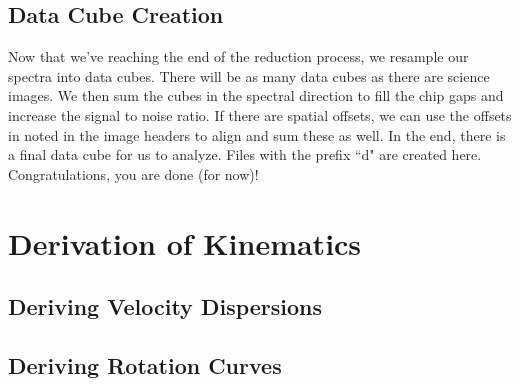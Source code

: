 \documentclass[12pt]{report}
\begin{document}
\section{Data Cube Creation}
Now that we've reaching the end of the reduction process, we resample our spectra into data cubes. There will be as many data cubes as there are science images. We then sum the cubes in the spectral direction to fill the chip gaps and increase the signal to noise ratio. If there are spatial offsets, we can use the offsets in noted in the image headers to align and sum these as well. In the end, there is a final data cube for us to analyze. Files with the prefix ``d" are created here. Congratulations, you are done (for now)!


\chapter{Derivation of Kinematics}

\section{Deriving Velocity Dispersions}
\section{Deriving Rotation Curves}

\end{document}
